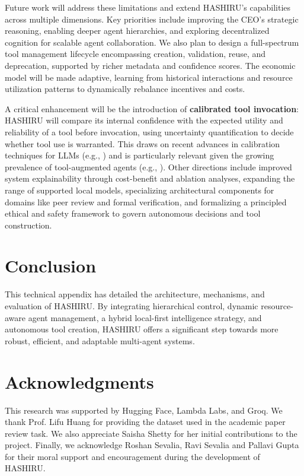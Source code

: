 \documentclass[twocolumn]{article}
\begin{document}
Future work will address these limitations and extend HASHIRU's capabilities across multiple dimensions. Key priorities include improving the CEO's strategic reasoning, enabling deeper agent hierarchies, and exploring decentralized cognition for scalable agent collaboration. We also plan to design a full-spectrum tool management lifecycle encompassing creation, validation, reuse, and deprecation, supported by richer metadata and confidence scores. The economic model will be made adaptive, learning from historical interactions and resource utilization patterns to dynamically rebalance incentives and costs.

A critical enhancement will be the introduction of \textbf{calibrated tool invocation}: HASHIRU will compare its internal confidence with the expected utility and reliability of a tool before invocation, using uncertainty quantification to decide whether tool use is warranted. This draws on recent advances in calibration techniques for LLMs (e.g., \cite{manggalaqa, spiess2024calibration}) and is particularly relevant given the growing prevalence of tool-augmented agents (e.g., \cite{Qin2023ToolLLM}). Other directions include improved system explainability through cost-benefit and ablation analyses, expanding the range of supported local models, specializing architectural components for domains like peer review and formal verification, and formalizing a principled ethical and safety framework to govern autonomous decisions and tool construction.
\section{Conclusion}
This technical appendix has detailed the architecture, mechanisms, and evaluation of HASHIRU. By integrating hierarchical control, dynamic resource-aware agent management, a hybrid local-first intelligence strategy, and autonomous tool creation, HASHIRU offers a significant step towards more robust, efficient, and adaptable multi-agent systems.

\section*{Acknowledgments}
This research was supported by Hugging Face, Lambda Labs, and Groq. We thank Prof. Lifu Huang for providing the dataset used in the academic paper review task. We also appreciate Saisha Shetty for her initial contributions to the project. Finally, we acknowledge Roshan Sevalia, Ravi Sevalia and Pallavi Gupta for their moral support and encouragement during the development of HASHIRU.



\end{document}
